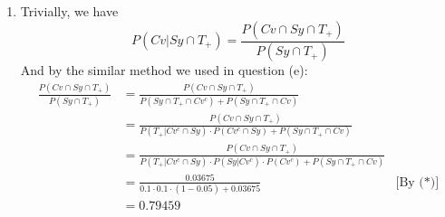 \documentclass[a4paper, 12pt]{article}
\begin{document}
\begin{enumerate}
\begin{enumerate}
		Similarly,
		$$\begin{aligned}
			P(T_+\cap Cv\cap Sy)
			&= P(T_+|Cv\cap Sy)\cdot P(Cv\cap Sy)\\
			&= P(T_+|Cv\cap Sy)\cdot P(Cv|Sy)\cdot P(Sy)\\
			&= 0.98\cdot 0.28302\cdot 0.1325\\
			&= 0.03675 &&(*)
	\end{aligned}$$

	And also 
	$$\begin{aligned}
		P(Cv\cap Sy^c)
		&= P(Cv) - P(Cv\cap Sy)\\
		&= P(Cv) - P(Cv|Sy)P(Sy)\\
		&= 0.05-0.28302\cdot0.132 \\
		&= 0.01250
	\end{aligned}$$

	Finall, We have the result, that is
	$$\begin{aligned}
	P(T_+|Cv\cap Sy^c) 
	&= \frac{P(T_+\cap Cv\cap Sy^c)}{P(Cv\cap Sy^c)}\\
	&= \frac{P(T_+\cap Cv)-P(T_+\cap Cv\cap Sy)}{P(Cv\cap Sy^c)}\\
	&= \frac{0.04-0.03675}{0.01250}\\
	&= 0.26
	\end{aligned}$$

\item Trivially, we have 
	$$P(Cv|Sy\cap T_+) = \frac{P(Cv\cap Sy\cap T_+)}{P(Sy\cap T_+)}$$
	And by the similar method we used in question (e):
	$$\begin{aligned}
	\frac{P(Cv\cap Sy\cap T_+)}{P(Sy\cap T_+)}
	&= \frac{P(Cv\cap Sy\cap T_+)}{P(Sy\cap T_+\cap Cv^c)+ P(Sy\cap T_+\cap Cv)}\\
	&= \frac{P(Cv\cap Sy\cap T_+)}{P(T_+|Cv^c\cap Sy)\cdot P(Cv^c\cap Sy)
	+ P(Sy\cap T_+\cap Cv)}\\
	&= \frac{P(Cv\cap Sy\cap T_+)}{P(T_+|Cv^c\cap Sy)\cdot P(Sy|Cv^c)\cdot 
		P(Cv^c)+ P(Sy\cap T_+\cap Cv)}\\
	&= \frac{0.03675}{0.1 \cdot 0.1\cdot(1-0.05) +0.03675}&\textrm{[By (*)]}\\
	&= 0.79459
	\end{aligned}$$


\end{enumerate}
\end{enumerate}
\end{document}
